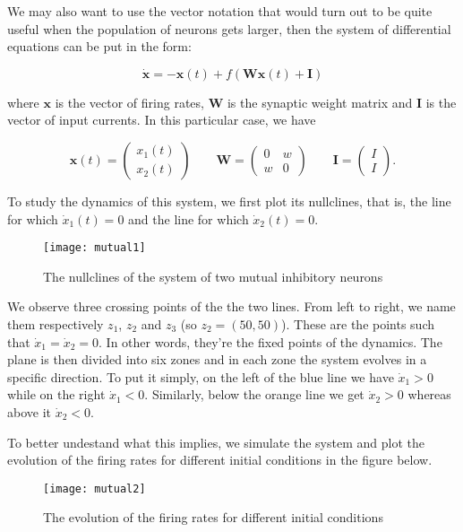 We may also want to use the vector notation that would turn out to be quite
useful when the population of neurons gets larger, then the system of
differential equations can be put in the form:

\[\dot{\mathbf{x}} = -\mathbf{x}(t) + f(\mathbf{Wx}(t) + \mathbf{I})\]

\noindent
where $\mathbf{x}$ is the vector of firing rates, $\mathbf{W}$ is the synaptic 
weight matrix and $\mathbf{I}$ is the vector of input currents. In this
particular case, we have

\[
  \mathbf{x}(t) = \left(
    \begin{array}{c}
      x_1(t)\\
      x_2(t)
    \end{array}\right) \qquad
  \mathbf{W} = \left(
    \begin{array}{cc}
      0 & w\\
      w & 0
    \end{array}\right) \qquad
  \mathbf{I} = \left(
    \begin{array}{c}
      I\\
      I
    \end{array}\right).
\]

To study the dynamics of this system, we first plot its nullclines, that is,
the line for which $\dot{x}_1(t)=0$ and the line for which $\dot{x}_2(t)=0$.

\begin{figure}[H]
  \centering
  \texttt{[image: mutual1]}
  \caption
    {The nullclines of the system of two mutual inhibitory neurons}
\end{figure}

We observe three crossing points of the the two lines. From left to right,
we name them respectively $z_1$, $z_2$ and $z_3$ (so $z_2 = (50,50)$).
These are the points such that $\dot{x}_1 = \dot{x}_2 = 0$. In other words,
they're the fixed points of the dynamics. The plane is then divided into six
zones and in each zone the system evolves in a specific direction. To put it
simply, on the left of the blue line we have $\dot{x}_1 > 0$ while on the
right $\dot{x}_1 < 0$. Similarly, below the orange line we get
$\dot{x}_2 > 0$ whereas above it $\dot{x}_2 < 0$.

To better undestand what this implies, we simulate the system and plot the 
evolution of the firing rates for different initial conditions in the figure 
below.

\begin{figure}[H]
  \centering
  \texttt{[image: mutual2]}
  \caption
    {The evolution of the firing rates for different initial conditions}
\end{figure}

